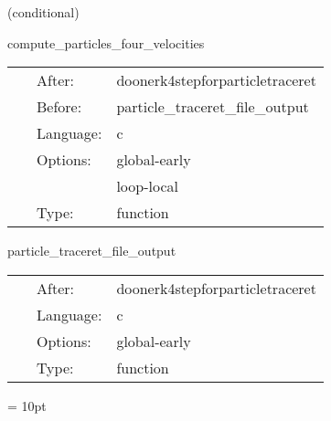 \vspace{5mm}

   (conditional) 

\hspace{5mm} compute\_particles\_four\_velocities 

\hspace{5mm}{\it compute particles four velocities } 


\hspace{5mm}

 \begin{tabular*}{160mm}{cll} 
~ & After:  & doonerk4stepforparticletraceret \\ 
~ & Before:  & particle\_traceret\_file\_output \\ 
~ & Language:  & c \\ 
~ & Options:  & global-early \\ 
~& ~ &loop-local\\ 
~ & Type:  & function \\ 
\end{tabular*} 


\vspace{5mm}


\hspace{5mm} particle\_traceret\_file\_output 

\hspace{5mm}{\it output particle traceret data to disk } 


\hspace{5mm}

 \begin{tabular*}{160mm}{cll} 
~ & After:  & doonerk4stepforparticletraceret \\ 
~ & Language:  & c \\ 
~ & Options:  & global-early \\ 
~ & Type:  & function \\ 
\end{tabular*} 



\vspace{5mm}\parskip = 10pt 

